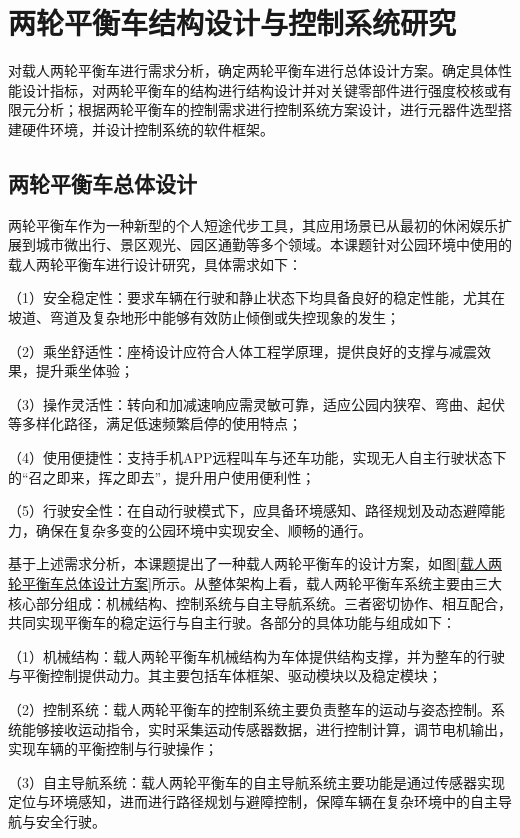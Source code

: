 ﻿%

\chapter{两轮平衡车结构设计与控制系统研究}

对载人两轮平衡车进行需求分析，确定两轮平衡车进行总体设计方案。确定具体性能设计指标，对两轮平衡车的结构进行结构设计并对关键零部件进行强度校核或有限元分析；根据两轮平衡车的控制需求进行控制系统方案设计，进行元器件选型搭建硬件环境，并设计控制系统的软件框架。

\section{两轮平衡车总体设计}

两轮平衡车作为一种新型的个人短途代步工具，其应用场景已从最初的休闲娱乐扩展到城市微出行、景区观光、园区通勤等多个领域。本课题针对公园环境中使用的载人两轮平衡车进行设计研究，具体需求如下：

（1）安全稳定性：要求车辆在行驶和静止状态下均具备良好的稳定性能，尤其在坡道、弯道及复杂地形中能够有效防止倾倒或失控现象的发生；

（2）乘坐舒适性：座椅设计应符合人体工程学原理，提供良好的支撑与减震效果，提升乘坐体验；

（3）操作灵活性：转向和加减速响应需灵敏可靠，适应公园内狭窄、弯曲、起伏等多样化路径，满足低速频繁启停的使用特点；

（4）使用便捷性：支持手机APP远程叫车与还车功能，实现无人自主行驶状态下的“召之即来，挥之即去”，提升用户使用便利性；

（5）行驶安全性：在自动行驶模式下，应具备环境感知、路径规划及动态避障能力，确保在复杂多变的公园环境中实现安全、顺畅的通行。

基于上述需求分析，本课题提出了一种载人两轮平衡车的设计方案，如图\ref{载人两轮平衡车总体设计方案}所示。从整体架构上看，载人两轮平衡车系统主要由三大核心部分组成：机械结构、控制系统与自主导航系统。三者密切协作、相互配合，共同实现平衡车的稳定运行与自主行驶。各部分的具体功能与组成如下：

（1）机械结构：载人两轮平衡车机械结构为车体提供结构支撑，并为整车的行驶与平衡控制提供动力。其主要包括车体框架、驱动模块以及稳定模块；

（2）控制系统：载人两轮平衡车的控制系统主要负责整车的运动与姿态控制。系统能够接收运动指令，实时采集运动传感器数据，进行控制计算，调节电机输出，实现车辆的平衡控制与行驶操作；

（3）自主导航系统：载人两轮平衡车的自主导航系统主要功能是通过传感器实现定位与环境感知，进而进行路径规划与避障控制，保障车辆在复杂环境中的自主导航与安全行驶。


